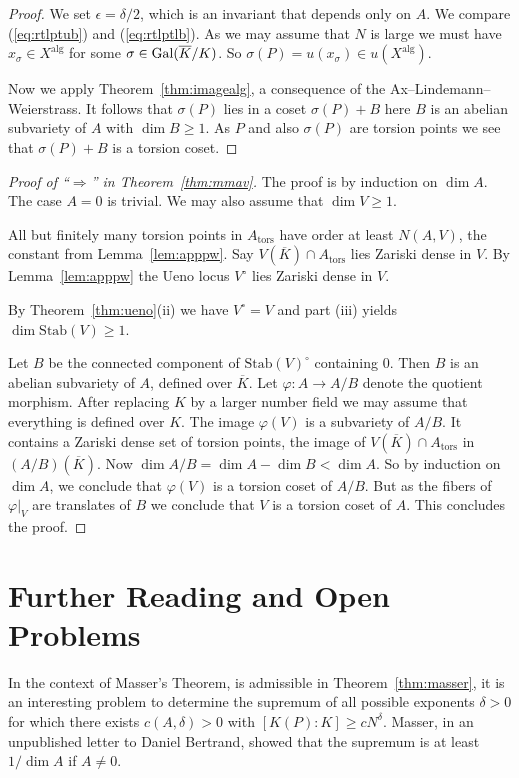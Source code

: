 \begin{proof}
  We set $\epsilon = \delta/2$, which is an invariant that depends only
  on $A$. We compare (\ref{eq:rtlptub}) and (\ref{eq:rtlptlb}). As we
  may assume that $N$ is large we must have $x_\sigma \in
  X^{\mathrm{alg}}$ for some $\sigma\in \mathrm{Gal}(\overline{K}/K)$. 
  So $\sigma(P) = u(x_\sigma)  \in u(X^{\mathrm{alg}})$.

  Now we apply Theorem~\ref{thm:imagealg}, a consequence of the
  Ax--Lindemann--Weierstrass. It follows that $\sigma(P)$ lies in a
  coset $\sigma(P)+B$ here $B$ is an abelian subvariety of $A$ with
  $\dim B\ge 1$. As $P$ and also $\sigma(P)$ are torsion points we see
  that $\sigma(P)+B$ is a torsion coset.
\end{proof}


\begin{proof}[Proof of ``$\Longrightarrow$'' in
  Theorem~\ref{thm:mmav}]
  The proof is by induction on $\dim A$. The case $A=0$ is trivial. 
  We may also assume that $\dim V\ge 1$.

  All but finitely many torsion
  points in $A_{\mathrm{tors}}$ have order at least $N(A,V)$, the
  constant from Lemma~\ref{lem:apppw}.
  Say $V(\overline K)\cap A_{\mathrm{tors}}$ lies Zariski dense in
  $V$. By Lemma~\ref{lem:apppw} 
  the Ueno locus $V^{\circ}$ lies Zariski dense in $V$.

  By Theorem~\ref{thm:ueno}(ii) we have $V^{\circ}=V$ and part (iii)
  yields $\dim \mathrm{Stab}(V) \ge 1$.

  Let $B$ be the connected component of $\mathrm{Stab}(V)^{\circ}$
  containing $0$. Then $B$ is an abelian subvariety of $A$, defined
  over $\overline K$. 
  Let $\varphi\colon A\rightarrow A/B$ denote the quotient morphism.
  After replacing $K$ by a larger number field we may assume that
  everything is defined over $K$.
  The image $\varphi(V)$ is a subvariety of $A/B$. It contains a
  Zariski dense set of torsion points, the image of $V(\overline
  K)\cap A_{\mathrm{tors}}$ in $(A/B)(\overline K)$.
  Now $\dim A/B = \dim A-\dim B<\dim A$. So by induction on $\dim A$,
  we conclude that $\varphi(V)$ is a torsion coset of $A/B$.
  But as the fibers of $\varphi|_V$ are translates of $B$ we conclude
  that $V$ is a torsion coset of $A$. This concludes the proof. 
\end{proof}

\section{Further Reading and Open Problems}

In the context of Masser's Theorem, is admissible in
Theorem~\ref{thm:masser}, it is an interesting problem to determine
the supremum of all possible exponents $\delta>0$ for which there
exists $c(A,\delta)>0$ with $[K(P):K]\ge c N^{\delta}$. Masser, in an
unpublished letter to Daniel Bertrand, showed that the supremum is at
least $1/\dim A$ if $A\not=0$. 



